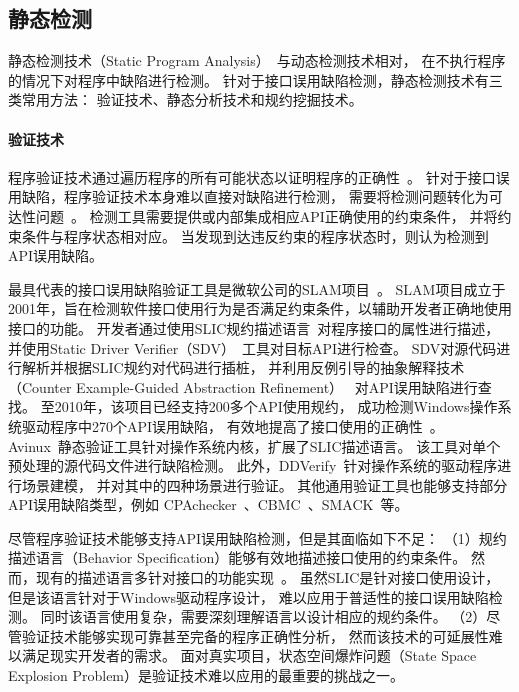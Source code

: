 \subsection{静态检测}
静态检测技术（Static Program Analysis）~\cite{08-ieee-static}与动态检测技术相对，
在不执行程序的情况下对程序中缺陷进行检测。
针对于接口误用缺陷检测，静态检测技术有三类常用方法：
验证技术、静态分析技术和规约挖掘技术。

\paragraph{验证技术}
程序验证技术通过遍历程序的所有可能状态以证明程序的正确性~\cite{08-tcad-sv}。
针对于接口误用缺陷，程序验证技术本身难以直接对缺陷进行检测，
需要将检测问题转化为可达性问题~\cite{rp}。
检测工具需要提供或内部集成相应API正确使用的约束条件，
并将约束条件与程序状态相对应。
当发现到达违反约束的程序状态时，则认为检测到API误用缺陷。

最具代表的接口误用缺陷验证工具是微软公司的SLAM项目~\cite{slam}。
SLAM项目成立于2001年，旨在检测软件接口使用行为是否满足约束条件，以辅助开发者正确地使用接口的功能。
开发者通过使用SLIC规约描述语言~\cite{01-slic}对程序接口的属性进行描述，
并使用Static Driver Verifier（SDV）~\cite{02-acm-slam}工具对目标API进行检查。
SDV对源代码进行解析并根据SLIC规约对代码进行插桩，
并利用反例引导的抽象解释技术（Counter Example-Guided Abstraction Refinement）
~\cite{00-cav-counter,02-acm-abs}对API误用缺陷进行查找。
至2010年，该项目已经支持200多个API使用规约，
成功检测Windows操作系统驱动程序中270个API误用缺陷，
有效地提高了接口使用的正确性~\cite{10-cad-slam, 11-acm-slam}。
Avinux~\cite{09-avinux}静态验证工具针对操作系统内核，扩展了SLIC描述语言。
该工具对单个预处理的源代码文件进行缺陷检测。
此外，DDVerify~\cite{07-ase-ddverify}针对操作系统的驱动程序进行场景建模，
并对其中的四种场景进行验证。
其他通用验证工具也能够支持部分API误用缺陷类型，例如
CPAchecker~\cite{07-cav-cpachecker}、CBMC~\cite{14-tacas-cbmc}、SMACK~\cite{14-cav-smack}等。


尽管程序验证技术能够支持API误用缺陷检测，但是其面临如下不足：
（1）规约描述语言（Behavior Specification）能够有效地描述接口使用的约束条件。
然而，现有的描述语言多针对接口的功能实现~\cite{blast, acsl}。
虽然SLIC是针对接口使用设计，但是该语言针对于Windows驱动程序设计，
难以应用于普适性的接口误用缺陷检测。
同时该语言使用复杂，需要深刻理解语言以设计相应的规约条件。
（2）尽管验证技术能够实现可靠甚至完备的程序正确性分析，
然而该技术的可延展性难以满足现实开发者的需求。
面对真实项目，状态空间爆炸问题（State Space Explosion Problem）是验证技术难以应用的最重要的挑战之一。

